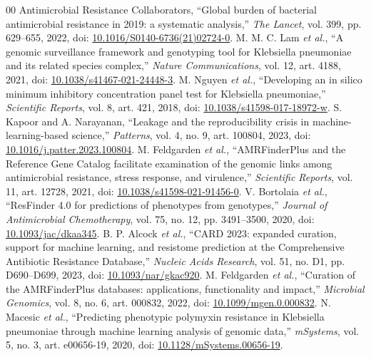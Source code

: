\documentclass[conference]{IEEEtran}
\begin{document}
\begin{thebibliography}{00}
 Antimicrobial Resistance Collaborators, ``Global burden of bacterial antimicrobial resistance in 2019: a systematic analysis,'' \textit{The Lancet}, vol. 399, pp. 629--655, 2022, doi: \href{https://doi.org/10.1016/S0140-6736(21)02724-0}{10.1016/S0140-6736(21)02724-0}.
 M. M. C. Lam \textit{et al.}, ``A genomic surveillance framework and genotyping tool for Klebsiella pneumoniae and its related species complex,'' \textit{Nature Communications}, vol. 12, art. 4188, 2021, doi: \href{https://doi.org/10.1038/s41467-021-24448-3}{10.1038/s41467-021-24448-3}.
 M. Nguyen \textit{et al.}, ``Developing an in silico minimum inhibitory concentration panel test for Klebsiella pneumoniae,'' \textit{Scientific Reports}, vol. 8, art. 421, 2018, doi: \href{https://doi.org/10.1038/s41598-017-18972-w}{10.1038/s41598-017-18972-w}.
 S. Kapoor and A. Narayanan, ``Leakage and the reproducibility crisis in machine-learning-based science,'' \textit{Patterns}, vol. 4, no. 9, art. 100804, 2023, doi: \href{https://doi.org/10.1016/j.patter.2023.100804}{10.1016/j.patter.2023.100804}.
 M. Feldgarden \textit{et al.}, ``AMRFinderPlus and the Reference Gene Catalog facilitate examination of the genomic links among antimicrobial resistance, stress response, and virulence,'' \textit{Scientific Reports}, vol. 11, art. 12728, 2021, doi: \href{https://doi.org/10.1038/s41598-021-91456-0}{10.1038/s41598-021-91456-0}.
 V. Bortolaia \textit{et al.}, ``ResFinder 4.0 for predictions of phenotypes from genotypes,'' \textit{Journal of Antimicrobial Chemotherapy}, vol. 75, no. 12, pp. 3491--3500, 2020, doi: \href{https://doi.org/10.1093/jac/dkaa345}{10.1093/jac/dkaa345}.
 B. P. Alcock \textit{et al.}, ``CARD 2023: expanded curation, support for machine learning, and resistome prediction at the Comprehensive Antibiotic Resistance Database,'' \textit{Nucleic Acids Research}, vol. 51, no. D1, pp. D690--D699, 2023, doi: \href{https://doi.org/10.1093/nar/gkac920}{10.1093/nar/gkac920}.
 M. Feldgarden \textit{et al.}, ``Curation of the AMRFinderPlus databases: applications, functionality and impact,'' \textit{Microbial Genomics}, vol. 8, no. 6, art. 000832, 2022, doi: \href{https://doi.org/10.1099/mgen.0.000832}{10.1099/mgen.0.000832}.
 N. Macesic \textit{et al.}, ``Predicting phenotypic polymyxin resistance in Klebsiella pneumoniae through machine learning analysis of genomic data,'' \textit{mSystems}, vol. 5, no. 3, art. e00656-19, 2020, doi: \href{https://doi.org/10.1128/mSystems.00656-19}{10.1128/mSystems.00656-19}.

\end{thebibliography}
\end{document}
